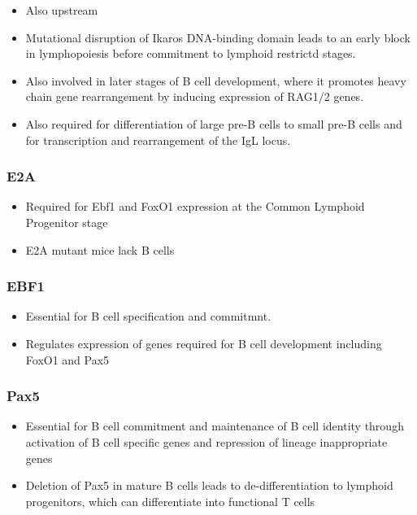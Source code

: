 \documentclass[12pt]{article}
\begin{document}
				\begin{itemize}
					\item Also upstream
					\item Mutational disruption of Ikaros DNA-binding domain leads to an early block in lymphopoiesis before commitment to lymphoid restrictd stages.
					\item Also involved in later stages of B cell development, where it promotes heavy chain gene rearrangement by inducing expression of RAG1/2 genes.
					\item Also required for differentiation of large pre-B cells to small pre-B cells and for transcription and rearrangement of the IgL locus.
				\end{itemize}
			
			\subsubsection{E2A}
				
				\begin{itemize}
					\item Required for Ebf1 and FoxO1 expression at the Common Lymphoid Progenitor stage
					\item E2A mutant mice lack B cells
				\end{itemize}
			
			\subsubsection{EBF1}
				
				\begin{itemize}
					\item Essential for B cell specification and commitmnt. 
					\item Regulates expression of genes required for B cell development including FoxO1 and Pax5
				\end{itemize}	
			
			\subsubsection{Pax5}
				
				\begin{itemize}
					\item Essential for B cell commitment and maintenance of B cell identity through activation of B cell specific genes and repression of lineage inappropriate genes
					\item Deletion of Pax5 in mature B cells leads to de-differentiation to lymphoid progenitors, which can differentiate into functional T cells
				\end{itemize}
			
\end{document}

